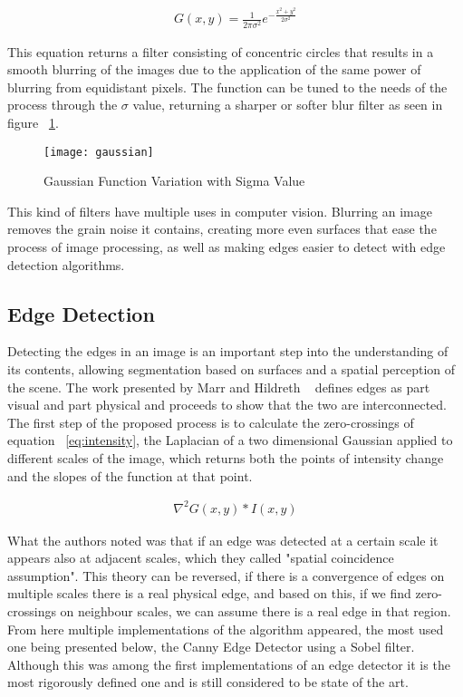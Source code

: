 \begin{eqnarray}
\label{eq:gaussian}
G(x,y) = \frac{1}{2\pi \sigma ^{2}}e^{-\frac{x^{2}+y^{2}}{2\sigma ^{2}}}
\end{eqnarray}

This equation returns a filter consisting of concentric circles that results in a smooth blurring of the images due to the application of the same power of blurring from equidistant pixels. The function can be tuned to the needs of the process through the $\sigma$ value, returning a sharper or softer blur filter as seen in figure ~\ref{fig:gaussian}.

\begin{figure}[h]
  \begin{center}
    \leavevmode
    \texttt{[image: gaussian]}
    \caption{Gaussian Function Variation with Sigma Value}
    \label{fig:gaussian}
  \end{center}
\end{figure}

This kind of filters have multiple uses in computer vision. Blurring an image removes the grain noise it contains, creating more even surfaces that ease the process of image processing, as well as making edges easier to detect with edge detection algorithms.

\subsection{Edge Detection}

Detecting the edges in an image is an important step into the understanding of its contents, allowing segmentation based on surfaces and a spatial perception of the scene. The work presented by Marr and Hildreth ~\cite{Marr1980TheoryOE} defines edges as part visual and part physical and proceeds to show that the two are interconnected. The first step of the proposed process is to calculate the zero-crossings of equation ~\ref{eq:intensity}, the Laplacian of a two dimensional Gaussian applied to different scales of the image, which returns both the points of intensity change and the slopes of the function at that point.

\begin{eqnarray}
\label{eq:intensity}
\nabla^{2} G(x,y)*I(x,y)
\end{eqnarray}

What the authors noted was that if an edge was detected at a certain scale it appears also at adjacent scales, which they called "spatial coincidence assumption". This theory can be reversed, if there is a convergence of edges on multiple scales there is a real physical edge, and based on this, if we find zero-crossings on neighbour scales, we can assume there is a real edge in that region. From here multiple implementations of the algorithm appeared, the most used one being presented below, the Canny Edge Detector using a Sobel filter. Although this was among the first implementations of an edge detector it is the most rigorously defined one and is still considered to be state of the art.

